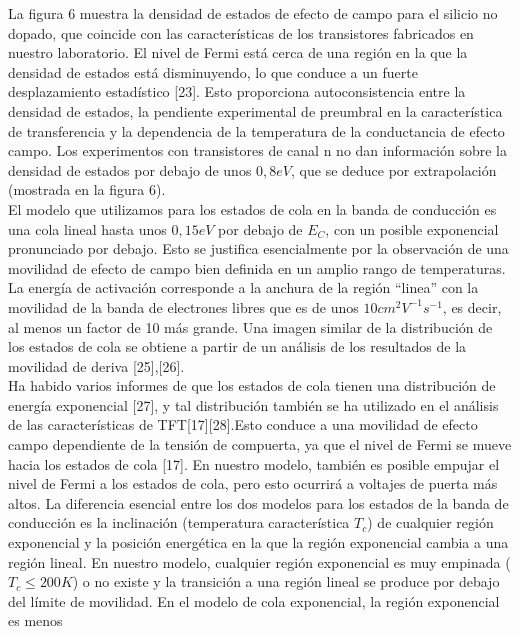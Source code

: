 \documentclass[conference]{IEEEtran}
\begin{document}
    La figura 6 muestra la densidad de estados de efecto de campo para el silicio no dopado, 
    que coincide con las características de los transistores fabricados en nuestro laboratorio. 
    El nivel de Fermi está cerca de una región en la que la densidad de estados está disminuyendo, 
    lo que conduce a un fuerte desplazamiento estadístico [23]. Esto proporciona autoconsistencia 
    entre la densidad de estados, la pendiente experimental de preumbral en la característica de 
    transferencia y la dependencia de la temperatura de la conductancia de efecto campo. Los 
    experimentos con transistores de canal n no dan información sobre la densidad de estados por 
    debajo de unos $0,8 eV$, que se deduce por extrapolación (mostrada en la figura 6).
    \\
    El modelo que utilizamos para los estados de cola en la banda de conducción es una cola lineal 
    hasta unos $0,15 eV$ por debajo de $E_C$, con un posible exponencial pronunciado por debajo. 
    Esto se justifica esencialmente por la observación de una movilidad de efecto de campo bien 
    definida en un amplio rango de temperaturas. La energía de activación corresponde a la anchura
    de la región ``linea'' con la movilidad de la banda de electrones libres que es de unos 
    $10 cm^2 V^{-1} s^{-1}$, es decir, al menos un factor de 10 más grande. Una imagen similar 
    de la distribución de los estados de cola se obtiene a partir de un análisis de los resultados 
    de la movilidad de deriva [25],[26]. 
    \\
    Ha habido varios informes de que los estados de cola tienen una distribución de energía 
    exponencial [27], y tal distribución también se ha utilizado en el análisis de las 
    características de TFT[17][28].Esto conduce a una movilidad de efecto campo dependiente de 
    la tensión de compuerta, ya que el nivel de Fermi se mueve hacia los estados de cola [17]. 
    En nuestro modelo, también es posible empujar el nivel de Fermi a los estados de cola, pero 
    esto ocurrirá a voltajes de puerta más altos. La diferencia esencial entre los dos modelos 
    para los estados de la banda de conducción es la inclinación (temperatura característica $T_c$) 
    de cualquier región exponencial y la posición energética en la que la región exponencial cambia 
    a una región lineal. En nuestro modelo, cualquier región exponencial es muy empinada 
    ($T_c \leq  200 K$) o no existe y la transición a una región lineal se produce por debajo 
    del límite de movilidad. En el modelo de cola exponencial, la región exponencial es menos 
\end{document}
